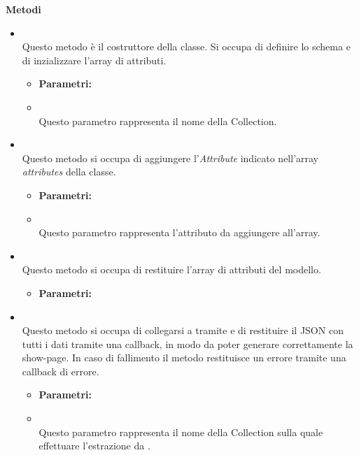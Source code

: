 \textbf{Metodi}
\begin{itemize}
\item[] \textbf{} \\ Questo metodo è il costruttore della classe. Si occupa di definire lo schema e di inzializzare l'array di attributi.
\begin{itemize}\addtolength{\itemsep}{-0.5\baselineskip}
\item[] \textbf{Parametri:}
\item[]  \\ Questo parametro rappresenta il nome della Collection.
\end{itemize}
\item[] \textbf{} \\ Questo metodo si occupa di aggiungere l'\textit{Attribute} indicato nell'array \textit{attributes} della classe.
\begin{itemize}\addtolength{\itemsep}{-0.5\baselineskip}
\item[] \textbf{Parametri:}
\item[]  \\ Questo parametro rappresenta l'attributo da aggiungere all'array.
\end{itemize}
\item[] \textbf{} \\ Questo metodo si occupa di restituire l'array di attributi del modello.
\begin{itemize}\addtolength{\itemsep}{-0.5\baselineskip}
\item[] \textbf{Parametri:}
\end{itemize}
\item[] \textbf{} \\ Questo metodo si occupa di collegarsi a  tramite  e di restituire il JSON con tutti i dati tramite una callback, in modo da poter generare correttamente la show-page. In caso di fallimento il metodo restituisce un errore tramite una callback di errore.
\begin{itemize}\addtolength{\itemsep}{-0.5\baselineskip}
\item[] \textbf{Parametri:}
\item[]  \\ Questo parametro rappresenta il nome della Collection sulla quale effettuare l'estrazione da .

\end{itemize}
\end{itemize}
